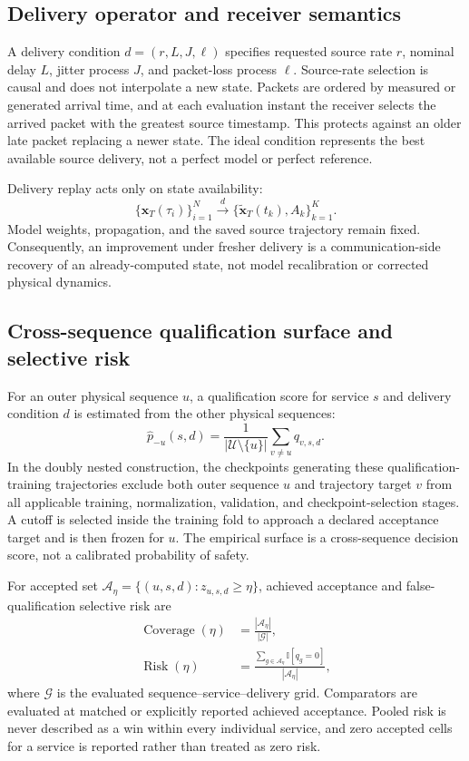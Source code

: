 \documentclass[journal,onecolumn]{IEEEtran}
\begin{document}
\subsection{Delivery operator and receiver semantics}
A delivery condition $d=(r,L,J,\ell)$ specifies requested source rate $r$, nominal delay $L$, jitter process $J$, and packet-loss process $\ell$. Source-rate selection is causal and does not interpolate a new state. Packets are ordered by measured or generated arrival time, and at each evaluation instant the receiver selects the arrived packet with the greatest source timestamp. This protects against an older late packet replacing a newer state. The ideal condition represents the best available source delivery, not a perfect model or perfect reference.

Delivery replay acts only on state availability:
\begin{equation}
\{\mathbf{x}_T(\tau_i)\}_{i=1}^{N}
\xrightarrow{\ d\ }
\{\widetilde{\mathbf{x}}_T(t_k),A_k\}_{k=1}^{K}.
\end{equation}
Model weights, propagation, and the saved source trajectory remain fixed. Consequently, an improvement under fresher delivery is a communication-side recovery of an already-computed state, not model recalibration or corrected physical dynamics.

\subsection{Cross-sequence qualification surface and selective risk}
For an outer physical sequence $u$, a qualification score for service $s$ and delivery condition $d$ is estimated from the other physical sequences:
\begin{equation}
\widehat p_{-u}(s,d)=
\frac{1}{|\mathcal{U}\setminus\{u\}|}
\sum_{v\ne u}q_{v,s,d}.
\end{equation}
In the doubly nested construction, the checkpoints generating these qualification-training trajectories exclude both outer sequence $u$ and trajectory target $v$ from all applicable training, normalization, validation, and checkpoint-selection stages. A cutoff is selected inside the training fold to approach a declared acceptance target and is then frozen for $u$. The empirical surface is a cross-sequence decision score, not a calibrated probability of safety.

For accepted set $\mathcal{A}_\eta=\{(u,s,d):z_{u,s,d}\ge\eta\}$, achieved acceptance and false-qualification selective risk are
\begin{align}
\operatorname{Coverage}(\eta)&=\frac{|\mathcal{A}_\eta|}{|\mathcal{G}|},\\
\operatorname{Risk}(\eta)&=
\frac{\sum_{g\in\mathcal{A}_\eta}\mathbb{I}[q_g=0]}
{|\mathcal{A}_\eta|},
\end{align}
where $\mathcal{G}$ is the evaluated sequence--service--delivery grid. Comparators are evaluated at matched or explicitly reported achieved acceptance. Pooled risk is never described as a win within every individual service, and zero accepted cells for a service is reported rather than treated as zero risk.
\end{document}

